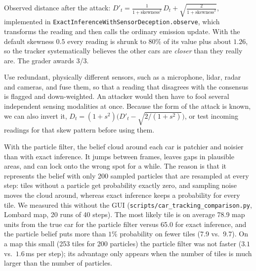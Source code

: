 Observed distance after the attack:
$D'_t=\frac{1}{1+\text{skewness}^2}\,D_t+\sqrt{\frac{2}{1+\text{skewness}^2}}$, implemented in
\texttt{ExactInferenceWithSensorDeception.observe}, which transforms the reading and then calls the ordinary
emission update. With the default skewness $0.5$ every reading is shrunk to $80\%$ of its value plus about
$1.26$, so the tracker systematically believes the other cars are \emph{closer} than they really are. The grader
awards 3/3.

\begin{solution}
Use redundant, physically different sensors, such as a microphone, lidar, radar and cameras, and fuse them, so
that a reading that disagrees with the consensus is flagged and down-weighted. An attacker would then have to fool
several independent sensing modalities at once. Because the form of the attack is known, we can also invert it,
$D_t=(1+s^2)\bigl(D'_t-\sqrt{2/(1+s^2)}\bigr)$, or test incoming readings for that skew pattern before using them.
\end{solution}

\begin{solution}
With the particle filter, the belief cloud around each car is patchier and noisier than with exact inference. It
jumps between frames, leaves gaps in plausible areas, and can lock onto the wrong spot for a while. The reason is
that it represents the belief with only 200 sampled particles that are resampled at every step: tiles without a
particle get probability exactly zero, and sampling noise moves the cloud around, whereas exact inference keeps a
probability for every tile. We measured this without the GUI (\texttt{scripts/car\_tracking\_comparison.py}, Lombard map,
20 runs of 40 steps). The most likely tile is on average 78.9 map units from the true car for the particle filter versus 65.0
for exact inference, and the particle belief puts more than $1\%$ probability on fewer tiles (7.9 vs.\ 9.7). On a
map this small (253 tiles for 200 particles) the particle filter was not faster ($3.1$ vs.\ $1.6$\,ms per step);
its advantage only appears when the number of tiles is much larger than the number of particles.
\end{solution}

